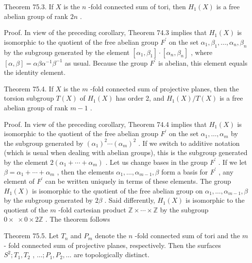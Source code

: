 \documentclass[10pt]{article}
\begin{document}
Theorem 75.3. If \(X\) is the \(n\) -fold connected sum of tori, then \({H}_{1}\left( X\right)\) is a free abelian group of rank \({2n}\) .

Proof. In view of the preceding corollary, Theorem 74.3 implies that \({H}_{1}\left( X\right)\) is isomorphic to the quotient of the free abelian group \({F}^{\prime }\) on the set \({\alpha }_{1},{\beta }_{1},\ldots ,{\alpha }_{n},{\beta }_{n}\) by the subgroup generated by the element \(\left\lbrack  {{\alpha }_{1},{\beta }_{1}}\right\rbrack   \cdot  \left\lbrack  {{\alpha }_{n},{\beta }_{n}}\right\rbrack\) , where \(\left\lbrack  {\alpha ,\beta }\right\rbrack   = {\alpha \beta }{\alpha }^{-1}{\beta }^{-1}\) as usual. Because the group \({F}^{\prime }\) is abelian, this element equals the identity element.

Theorem 75.4. If \(X\) is the \(m\) -fold connected sum of projective planes, then the torsion subgroup \(T\left( X\right)\) of \({H}_{1}\left( X\right)\) has order 2, and \({H}_{1}\left( X\right) /T\left( X\right)\) is a free abelian group of rank \(m - 1\) .

Proof. In view of the preceding corollary, Theorem 74.4 implies that \({H}_{1}\left( X\right)\) is isomorphic to the quotient of the free abelian group \({F}^{\prime }\) on the set \({\alpha }_{1},\ldots ,{\alpha }_{m}\) by the subgroup generated by \({\left( {\alpha }_{1}\right) }^{2}\cdots {\left( {\alpha }_{m}\right) }^{2}\) . If we switch to additive notation (which is usual when dealing with abelian groups), this is the subgroup generated by the element \(2\left( {{\alpha }_{1} + \cdots  + {\alpha }_{m}}\right)\) . Let us change bases in the group \({F}^{\prime }\) . If we let \(\beta  = {\alpha }_{1} + \cdots  + {\alpha }_{m}\) , then the elements \({\alpha }_{1},\ldots ,{\alpha }_{m - 1},\beta\) form a basis for \({F}^{\prime }\) , any element of \({F}^{\prime }\) can be written uniquely in terms of these elements. The group \({H}_{1}\left( X\right)\) is isomorphic to the quotient of the free abelian group on \({\alpha }_{1},\ldots ,{\alpha }_{m - 1},\beta\) by the subgroup generated by \({2\beta }\) . Said differently, \({H}_{1}\left( X\right)\) is isomorphic to the quotient of the \(m\) -fold cartesian product \(\mathbb{Z} \times  \cdots  \times  \mathbb{Z}\) by the subgroup \(0 \times  \; \times  0 \times  2\mathbb{Z}\) . The theorem follows

Theorem 75.5. Let \({T}_{n}\) and \({P}_{m}\) denote the \(n\) -fold connected sum of tori and the \(m\) - fold connected sum of projective planes, respectively. Then the surfaces \({S}^{2};{T}_{1},{T}_{2}\) , \(\ldots ;{P}_{1},{P}_{2},\ldots\) are topologically distinct.
\end{document}
